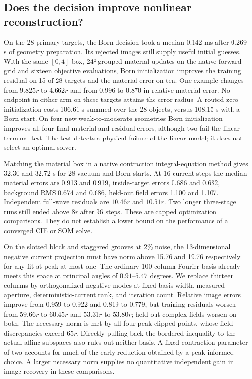 \subsection{Does the decision improve nonlinear reconstruction?}
On the 28 primary targets, the Born decision took a median 0.142 ms after 0.269 s of geometry preparation. Its rejected images still supply useful initial guesses. With the same $[0,4]$ box, 24² grouped material updates on the native forward grid and sixteen objective evaluations, Born initialization improves the training residual on 15 of 28 targets and the material error on ten. One example changes from $9.825r$ to $4.662r$ and from 0.996 to 0.870 in relative material error. No endpoint in either arm on these targets attains the error radius. A routed zero initialization costs 106.61 s summed over the 28 objects, versus 108.15 s with a Born start. On four new weak-to-moderate geometries Born initialization improves all four final material and residual errors, although two fail the linear terminal test. The test detects a physical failure of the linear model; it does not select an optimal solver.

Matching the material box in a native contraction integral-equation method gives 32.30 and 32.72 s for 28 vacuum and Born starts. At 16 current steps the median material errors are 0.913 and 0.919, inside-target errors 0.686 and 0.682, background RMS 0.674 and 0.686, held-out field errors 1.100 and 1.107. Independent full-wave residuals are $10.46r$ and $10.61r$. Two longer three-stage runs still ended above $8r$ after 96 steps. These are capped optimization comparisons. They do not establish a lower bound on the performance of a converged CIE or SOM solve.

On the slotted block and staggered grooves at 2\% noise, the 13-dimensional negative current projection must have norm above 15.76 and 19.76 respectively for any fit at peak at most one. The ordinary 100-column Fourier basis already meets this space at principal angles of $0.91$--$5.47$ degrees. We replace thirteen columns by orthogonalized negative modes at fixed basis width, measured aperture, deterministic-current rank, and iteration count. Relative image errors improve from 0.959 to 0.922 and 0.819 to 0.779, but training residuals worsen from $59.66r$ to $60.45r$ and $53.31r$ to $53.80r$; held-out complex fields worsen on both. The necessary norm is met by all four peak-clipped points, whose field discrepancies exceed $65r$. Directly pulling back the bordered inequality to the actual affine subspaces also rules out neither basis. A fixed contraction parameter of two accounts for much of the early reduction obtained by a peak-informed choice. A larger necessary norm supplies no quantitative independent gain in image recovery in these comparisons.

